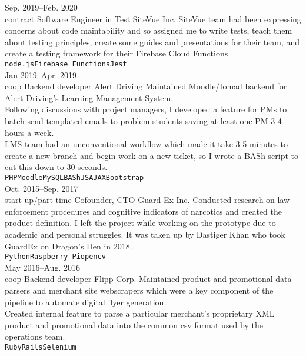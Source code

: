 \documentclass[9pt]{developercv} %
\begin{document}
\begin{entrylist}
	\entry
		{Sep. 2019--Feb. 2020\\\footnotesize{contract}}
		{Software Engineer in Test}
		{SiteVue Inc.}
		{SiteVue team had been expressing concerns about code maintability and so assigned me to write tests, teach them about testing principles, create some guides and presentations for their team, and create a testing framework for their Firebase Cloud Functions \\\texttt{node.js}\slashsep\texttt{Firebase Functions}\slashsep\texttt{Jest}}
    \\
	\entry
		{Jan 2019--Apr. 2019\\\footnotesize{coop}}
		{Backend developer}
		{Alert Driving}
		{Maintained Moodle/Iomad backend for Alert Driving's Learning Management System.\smallskip \\ Following discussions with  project managers, I developed a feature for PMs to batch-send templated emails to problem students saving at least one PM 3-4 hours a week.\smallskip \\LMS team had an unconventional workflow which made it take 3-5 minutes to create a new branch and begin work on a new ticket, so I wrote a BASh script to cut this down to 30 seconds. \smallskip \\\texttt{PHP}\slashsep\texttt{Moodle}\slashsep\texttt{MySQL}\slashsep\texttt{BASh}\slashsep\texttt{JS}\slashsep\texttt{AJAX}\slashsep\texttt{Bootstrap}}
    \\
	\entry
		{Oct. 2015--Sep. 2017\\\footnotesize{start-up/part time}}
		{Cofounder, CTO}
		{Guard-Ex Inc.}
		{Conducted research on law enforcement procedures and cognitive indicators of narcotics and created the product definition. I left the project while working on the prototype due to academic and personal struggles. It was taken up by Dastiger Khan who took GuardEx on Dragon's Den in 2018.\smallskip \\\texttt{Python}\slashsep\texttt{Raspberry Pi}\slashsep\texttt{opencv}}
    \\
  \entry
    {May 2016--Aug. 2016\\\footnotesize{coop}}
    {Backend developer}
    {Flipp Corp.}
    {Maintained product and promotional data parsers and merchant site webscrapers which were a key component of the pipeline to automate digital flyer generation. \smallskip \\ Created internal feature to parse a particular merchant's proprietary XML product and promotional data into the common csv format used by the operations team. \smallskip \\\texttt{Ruby}\slashsep\texttt{Rails}\slashsep\texttt{Selenium}}
\end{entrylist}
\end{document}
